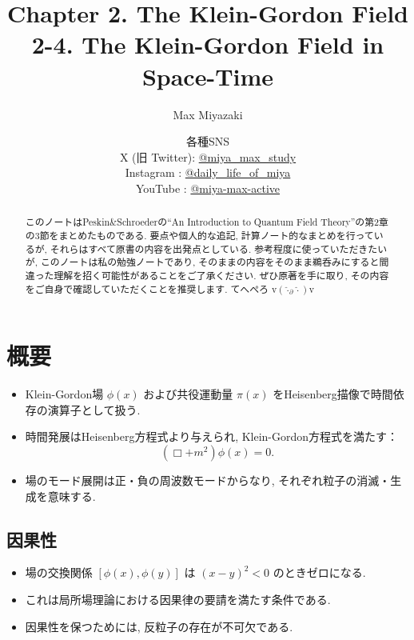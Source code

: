 \documentclass[a4paper,12pt]{article}
\title{Chapter 2. The Klein-Gordon Field\\
2-4. The Klein-Gordon Field in Space-Time}
\date{各種SNS\\
    X (旧 Twitter): \href{https://x.com/miya_max_study}{@miya\_max\_study}\\
    Instagram : \href{https://www.instagram.com/daily_life_of_miya/}{@daily\_life\_of\_miya}\\
    YouTube : \href{https://www.youtube.com/@miya-max-active}{@miya-max-active}
    }
\author{Max Miyazaki}
\begin{document}
\maketitle

\vspace{1cm}
\begin{abstract}
    このノートはPeskin\&Schroederの``An Introduction to Quantum Field Theory''の第2章の3節をまとめたものである. 要点や個人的な追記, 計算ノート的なまとめを行っているが, それらはすべて原書の内容を出発点としている. 参考程度に使っていただきたいが, このノートは私の勉強ノートであり, そのままの内容をそのまま鵜呑みにすると間違った理解を招く可能性があることをご了承ください. ぜひ原著を手に取り, その内容をご自身で確認していただくことを推奨します. てへぺろ v$({\hat{\cdot}_\partial \hat{\cdot}})$v



\end{abstract}
    
    

\newpage

\color{blue}
\section*{概要}
\begin{itemize}
  \item Klein-Gordon場 $\phi(x)$ および共役運動量 $\pi(x)$ をHeisenberg描像で時間依存の演算子として扱う.
  \item 時間発展はHeisenberg方程式より与えられ, Klein-Gordon方程式を満たす：
  \begin{equation*}
    (\Box + m^2)\phi(x) = 0.
  \end{equation*}
  \item 場のモード展開は正・負の周波数モードからなり, それぞれ粒子の消滅・生成を意味する.
\end{itemize}

\subsection*{因果性}
\begin{itemize}
  \item 場の交換関係 $[\phi(x), \phi(y)]$ は $(x - y)^2 < 0$ のときゼロになる.
  \item これは局所場理論における因果律の要請を満たす条件である.
  \item 因果性を保つためには, 反粒子の存在が不可欠である.
\end{itemize}
\end{document}

